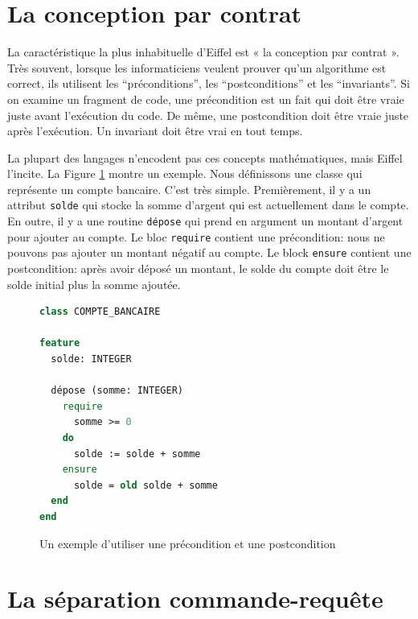 \documentclass[french]{report}
\begin{document}
\section{La conception par contrat}

La caractéristique la plus inhabituelle d'Eiffel est « la conception par contrat ». Très souvent, lorsque les informaticiens veulent prouver qu’un algorithme est correct, ils utilisent les \enquote{préconditions}, les \enquote{postconditions} et les \enquote{invariants}. Si on examine un fragment de code, une précondition est un fait qui doit être vraie juste avant l’exécution du code. De même, une postcondition doit être vraie juste après l’exécution. Un invariant doit être vrai en tout temps.

La plupart des langages n'encodent pas	ces concepts mathématiques, mais Eiffel l'incite. La Figure \ref{fig:pre-post-condition} montre un exemple. Nous définissons une classe qui représente un compte bancaire. C'est très simple. Premièrement, il y a un attribut \texttt{solde} qui stocke la somme d'argent qui est actuellement dans le compte. En outre, il y a une routine \texttt{dépose} qui prend en argument un montant d'argent pour ajouter au compte. Le bloc \texttt{require} contient une précondition: nous ne pouvons pas ajouter un montant négatif au compte. Le block \texttt{ensure} contient une postcondition: après avoir déposé un montant, le solde du compte doit être le solde initial plus la somme ajoutée.

\begin{figure}[h]
	\begin{lstlisting}[language=Eiffel]
class COMPTE_BANCAIRE

feature
  solde: INTEGER

  dépose (somme: INTEGER)
    require
      somme >= 0
    do
      solde := solde + somme
    ensure
      solde = old solde + somme
  end
end
	\end{lstlisting}
	
	\caption{Un exemple d'utiliser une précondition et une postcondition\protect\footnotemark}
	\label{fig:pre-post-condition}
\end{figure}


\section{La séparation commande-requête}
\end{document}
